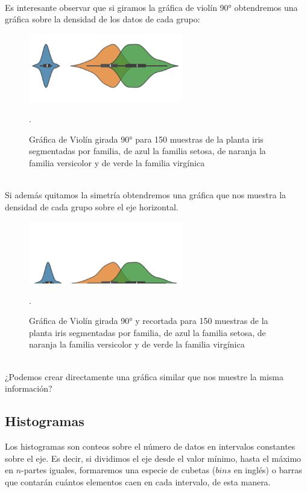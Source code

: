 \documentclass{article}
\begin{document}
\clearpage

\hfill\hfill\\
Es interesante observar que si giramos la gráfica de violín 90° obtendremos una gráfica sobre la densidad de los datos de cada grupo:
\begin{figure}[h]
    \centering
    \includegraphics[width=0.6\textwidth]{figures/violin3.png}
    \captionsetup{width=0.8\textwidth}
    \caption{Gráfica de Violín girada 90° para 150 muestras de la planta iris segmentadas por familia, de azul la familia setosa, de naranja la familia versicolor y de verde la familia virgínica}.
    \label{fig:violin3}
\end{figure}
\\
Si además quitamos la simetría obtendremos una gráfica que nos muestra la densidad de cada grupo sobre el eje horizontal.
\begin{figure}[h]
    \centering
    \includegraphics[width=0.6\textwidth]{figures/violin4.png}
    \captionsetup{width=0.8\textwidth}
    \caption{Gráfica de Violín girada 90° y recortada para 150 muestras de la planta iris segmentadas por familia, de azul la familia setosa, de naranja la familia versicolor y de verde la familia virgínica}.
    \label{fig:violin4}
\end{figure}
\\
¿Podemos crear directamente una gráfica similar que nos muestre la misma información?

\subsection{Histogramas}

Los histogramas son conteos sobre el número de datos en intervalos constantes sobre el eje. Es decir, si dividimos el eje desde el valor mínimo, hasta el máximo en $n$-partes iguales, formaremos una especie de cubetas ($bins$ en inglés) o barras que contarán cuántos elementos caen en cada intervalo, de esta manera. 
\end{document}
